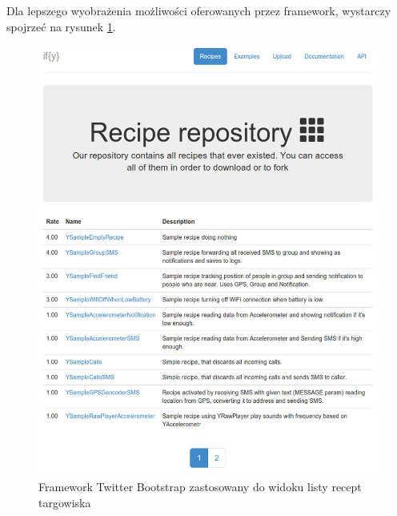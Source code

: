 \documentclass[11pt,a4paper,polish,thesis]{dcsbook}
\begin{document}
Dla lepszego wyobrażenia możliwości oferowanych przez framework, wystarczy spojrzeć na rysunek \ref{fig:market}.
\begin{figure}[p]
  \centering
  \includegraphics[scale=0.5]{./resources/market.png}
  \caption{Framework Twitter Bootstrap zastosowany do widoku listy recept targowiska}
  \label{fig:market}
\end{figure}
\end{document}
